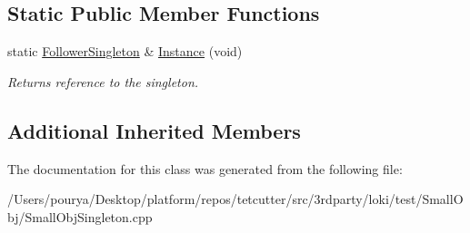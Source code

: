 \subsection*{Static Public Member Functions}
\begin{DoxyCompactItemize}
\item 
\hypertarget{classFollowerSingleton_a9c72e53d4d5b2264296c6c349e5a4710}{}static \hyperlink{classFollowerSingleton}{Follower\+Singleton} \& \hyperlink{classFollowerSingleton_a9c72e53d4d5b2264296c6c349e5a4710}{Instance} (void)\label{classFollowerSingleton_a9c72e53d4d5b2264296c6c349e5a4710}

\begin{DoxyCompactList}\small\item\em Returns reference to the singleton. \end{DoxyCompactList}\end{DoxyCompactItemize}
\subsection*{Additional Inherited Members}


The documentation for this class was generated from the following file\+:\begin{DoxyCompactItemize}
\item 
/\+Users/pourya/\+Desktop/platform/repos/tetcutter/src/3rdparty/loki/test/\+Small\+Obj/Small\+Obj\+Singleton.\+cpp\end{DoxyCompactItemize}
